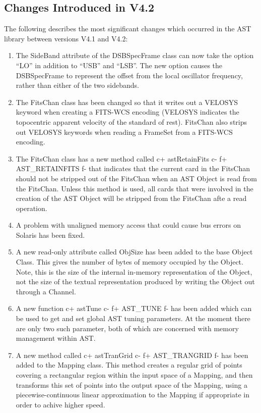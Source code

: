 \documentclass[twoside,11pt]{article}
\begin{document}
\subsection{Changes Introduced in V4.2}

The following describes the most significant changes which
occurred in the AST library between versions V4.1 and V4.2:

\begin{enumerate}

\item The SideBand attribute of the DSBSpecFrame class can now take the
option ``LO'' in addition to ``USB'' and ``LSB''. The new option causes the
DSBSpecFrame to represent the offset from the local oscillator frequency,
rather than either of the two sidebands.

\item The FitsChan class has been changed so that it writes out a VELOSYS
keyword when creating a FITS-WCS encoding (VELOSYS indicates the topocentric
apparent velocity of the standard of rest). FitsChan also strips out VELOSYS
keywords when reading a FrameSet from a FITS-WCS encoding.

\item The FitsChan class has a new method called
c+
astRetainFits
c-
f+
AST\_RETAINFITS
f-
that indicates that the current card in the FitsChan should not be
stripped out of the FitsChan when an AST Object is read from the FitsChan.
Unless this method is used, all cards that were involved in the creation
of the AST Object will be stripped from the FitsChan afte a read operation.

\item A problem with unaligned memory access that could cause bus errors on
Solaris has been fixed.

\item A new read-only attribute called ObjSize has been added to the base
Object Class. This gives the number of bytes of memory occupied by the
Object. Note, this is the size of the internal in-memory representation of
the Object, not the size of the textual representation produced by
writing the Object out through a Channel.

\item A new function
c+
astTune
c-
f+
AST\_TUNE
f-
has been added which can be used to get and set global AST tuning
parameters. At the moment there are only two such parameter, both of
which are concerned with memory management within AST.

\item A new method called
c+
astTranGrid
c-
f+
AST\_TRANGRID
f-
has been added to the Mapping class. This method creates a regular
grid of points covering a rectangular region within the input space of a
Mapping, and then transforms this set of points into the output space of the
Mapping, using a piecewise-continuous linear approximation to the Mapping
if appropriate in order to achive higher speed.


\end{enumerate}
\end{document}
